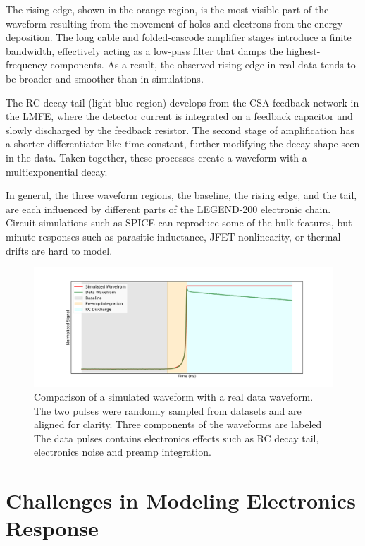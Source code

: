 The rising edge, shown in the orange region, is the most visible part of the waveform resulting from the movement of holes and electrons from the energy deposition. The long cable and folded-cascode amplifier stages introduce a finite bandwidth, effectively acting as a low-pass filter that damps the highest-frequency components. As a result, the observed rising edge in real data tends to be broader and smoother than in simulations. 

The RC decay tail (light blue region) develops from the CSA feedback network in the LMFE, where the detector current is integrated on a feedback capacitor and slowly discharged by the feedback resistor. The second stage of amplification has a shorter differentiator-like time constant, further modifying the decay shape seen in the data. Taken together, these processes create a waveform with a multiexponential decay. 


In general, the three waveform regions, the baseline, the rising edge, and the tail, are each influenced by different parts of the LEGEND-200 electronic chain. Circuit simulations such as SPICE can reproduce some of the bulk features, but minute responses such as parasitic inductance, JFET nonlinearity, or thermal drifts are hard to model.

\begin{figure}[!htb]%
    \includegraphics[width=\linewidth,trim={4cm 0pc 3.5cm 0pc},clip]{ch6/figs/wf_comp_sim_data.pdf}
    \caption{Comparison of a simulated waveform with a real data waveform. The two pulses were randomly sampled from datasets and are aligned for clarity. Three components of the waveforms are labeled The data pulses contains electronics effects such as RC decay tail, electronics noise and preamp integration.}
    \label{fig:sim_data_comp}
\end{figure}

\section{Challenges in Modeling Electronics Response}

